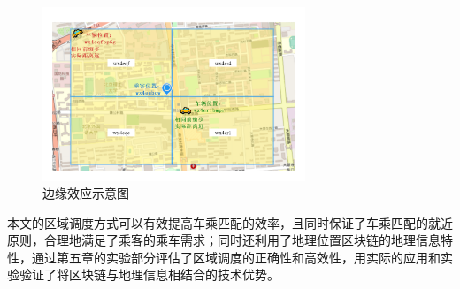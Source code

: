 \begin{figure}
  \centering
  \includegraphics[width=0.7\textwidth]{figures/边缘效应}
  \caption{边缘效应示意图}\label{fig:special}
\end{figure}

本文的区域调度方式可以有效提高车乘匹配的效率，且同时保证了车乘匹配的就近原则，合理地满足了乘客的乘车需求；同时还利用了地理位置区块链的地理信息特性，通过第五章的实验部分评估了区域调度的正确性和高效性，用实际的应用和实验验证了将区块链与地理信息相结合的技术优势。\par

